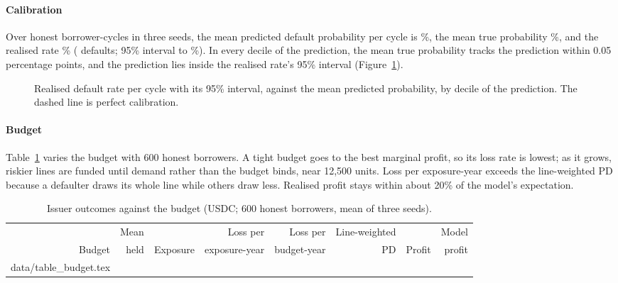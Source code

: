 \documentclass[preprint,11pt,authoryear]{elsarticle}
\makeatletter
\newcommand{\inputrows}[1]{\@@input #1 }
\makeatother
\begin{document}
\paragraph{Calibration} Over \CalCycles{} honest borrower-cycles in three seeds, the mean predicted
default probability per cycle is \CalPredicted\%, the mean true probability \CalTrue\%, and the
realised rate \CalRealised\% (\CalDefaults{} defaults; 95\% interval \CalLo{} to \CalHi\%). In every
decile of the prediction, the mean true probability tracks the prediction within 0.05 percentage
points, and the prediction lies inside the realised rate's 95\% interval (Figure~\ref{fig:calibration}).

\begin{figure}[ht]
  \centering
  
  \caption{Realised default rate per cycle with its 95\% interval, against the mean predicted
  probability, by decile of the prediction. The dashed line is perfect calibration.}
  \label{fig:calibration}
\end{figure}

\paragraph{Budget} Table~\ref{tab:budget} varies the budget with 600 honest borrowers. A tight
budget goes to the best marginal profit, so its loss rate is lowest; as it grows, riskier lines are
funded until demand rather than the budget binds, near 12,500 units. Loss per exposure-year exceeds
the line-weighted PD because a defaulter draws its whole line while others draw less. Realised profit
stays within about 20\% of the model's expectation.

\begin{table}[ht]
  \centering\small
  \caption{Issuer outcomes against the budget (USDC; 600 honest borrowers, mean of three seeds).}
  \label{tab:budget}
  \footnotesize\setlength{\tabcolsep}{4pt}
  \begin{tabular}{rrrrrrrr}
    \toprule
    & Mean & & Loss per & Loss per & Line-weighted & & Model \\
    Budget & held & Exposure & exposure-year & budget-year & PD & Profit & profit \\
    \midrule
    \inputrows{data/table_budget.tex}
    \bottomrule
  \end{tabular}
\end{table}
\end{document}

